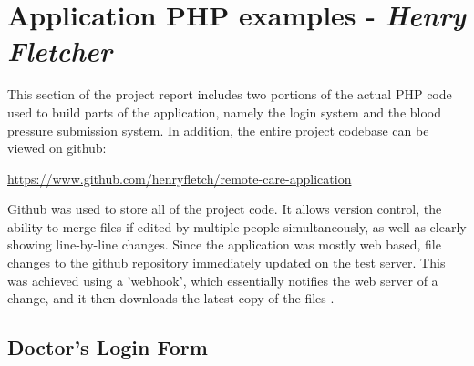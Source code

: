 \documentclass[11pt]{article}
\begin{document}
\section{Application PHP examples - \textit{Henry Fletcher}}
This section of the project report includes two portions of the actual PHP code used to build parts of the application, namely the login system and the blood pressure submission system. In addition, the entire project codebase can be viewed on github:
\begin{framed}
\url{https://www.github.com/henryfletch/remote-care-application}
\end{framed}
Github was used to store all of the project code. It allows version control, the ability to merge files if edited by multiple people simultaneously, as well as clearly showing line-by-line changes. Since the application was mostly web based, file changes to the github repository immediately updated on the test server. This was achieved using a 'webhook', which essentially notifies the web server of a change, and it then downloads the latest copy of the files \cite{github:webhooks} \cite{github:webhook-2}. 

\subsection{Doctor's Login Form} \label{drloginform}

\end{document}
